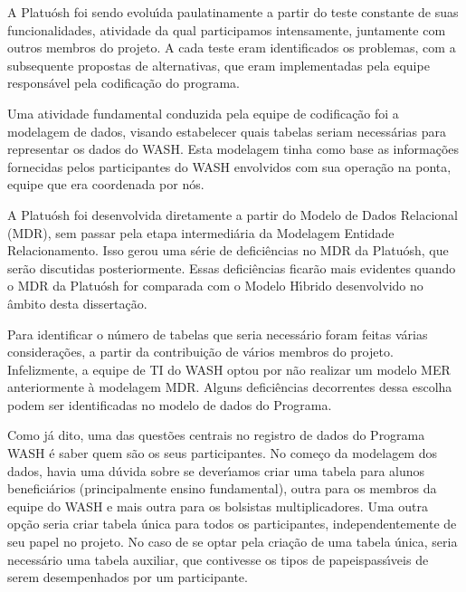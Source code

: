 \documentclass[
12pt,		%
openright,	%
twoside,  %
a4paper,			%
chapter=TITLE,		%
english,			%
french,				%
spanish,			%
brazil				%
]{USPSC-classe/USPSC}
\begin{document}
A Platu\'osh foi sendo evolu\'{\i}da paulatinamente a partir do teste constante de suas funcionalidades, atividade da qual participamos intensamente, juntamente com outros membros do projeto. A cada teste eram identificados os problemas, com a subsequente propostas de alternativas, que eram implementadas pela equipe respons\'avel pela codifica\c{c}\~ao do programa.




Uma atividade fundamental conduzida pela equipe de codifica\c{c}\~ao foi a modelagem de dados, visando estabelecer quais tabelas seriam necess\'arias para representar os dados do WASH. Esta modelagem tinha como base as informa\c{c}\~oes fornecidas pelos participantes do WASH envolvidos com sua opera\c{c}\~ao na ponta, equipe que era coordenada por n\'os.




A Platu\'osh foi desenvolvida diretamente a partir do Modelo de Dados Relacional (MDR), sem passar pela etapa intermedi\'aria da Modelagem Entidade Relacionamento. Isso gerou uma s\'erie de defici\^encias no MDR da Platu\'osh, que ser\~ao discutidas posteriormente. Essas defici\^encias ficar\~ao mais evidentes quando o MDR da Platu\'osh for comparada com o Modelo H\'{\i}brido desenvolvido no \^ambito desta disserta\c{c}\~ao.




Para identificar o n\'umero de tabelas que seria necess\'ario foram feitas v\'arias considera\c{c}\~oes, a partir da contribui\c{c}\~ao de v\'arios membros do projeto. Infelizmente, a equipe de TI do WASH optou por n\~ao realizar um modelo MER anteriormente \`a modelagem MDR. Alguns defici\^encias decorrentes dessa escolha podem ser identificadas no modelo de dados do Programa.




Como j\'a dito, uma das quest\~oes centrais no registro de dados do Programa WASH \'e saber quem s\~ao os seus participantes. No come\c{c}o da modelagem dos dados, havia uma d\'uvida sobre se dever\'{\i}amos criar uma tabela para alunos benefici\'arios (principalmente ensino fundamental), outra para os membros da equipe do WASH e mais outra para os bolsistas multiplicadores. Uma outra op\c{c}\~ao seria criar tabela \'unica para todos os participantes, independentemente de seu papel no projeto. No caso de se optar pela cria\c{c}\~ao de uma tabela \'unica, seria necess\'ario uma tabela auxiliar, que contivesse os \textquotedbl tipos de papeis\textquotedbl  pass\'{\i}veis de serem desempenhados por um participante.
\end{document}
